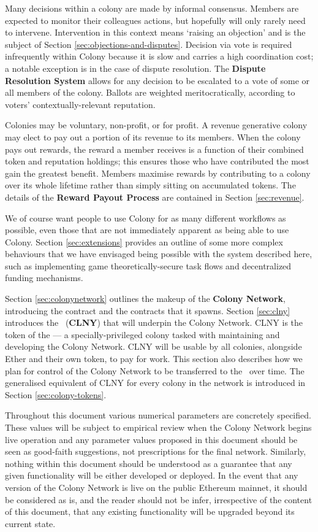 Many decisions within a colony are made by informal consensus. Members are expected to monitor their colleagues actions, but hopefully will only rarely need to intervene. Intervention in this context means `raising an objection' and is the subject of Section \ref{sec:objections-and-disputes}. Decision via vote is required infrequently within Colony because it is slow and carries a high coordination cost; a notable exception is in the case of dispute resolution. The \textbf{Dispute Resolution System} allows for any decision to be escalated to a vote of some or all members of the colony. Ballots are weighted meritocratically, according to voters' contextually-relevant reputation.

Colonies may be voluntary, non-profit, or for profit. A revenue generative colony may elect to pay out a portion of its revenue to its members. When the colony pays out rewards, the reward a member receives is a function of their combined token and reputation holdings; this ensures those who have contributed the most gain the greatest benefit. Members maximise rewards by contributing to a colony over its whole lifetime rather than simply sitting on accumulated tokens. The details of the \textbf{Reward Payout Process} are contained in Section \ref{sec:revenue}.

We of course want people to use Colony for as many different workflows as possible, even those that are not immediately apparent as being able to use Colony. Section \ref{sec:extensions} provides an outline of some more complex behaviours that we have envisaged being possible with the system described here, such as implementing game theoretically-secure task flows and decentralized funding mechanisms.

Section \ref{sec:colonynetwork} outlines the makeup of the \textbf{Colony Network}, introducing the  contract and the  contracts that it spawns. Section \ref{sec:clny} introduces the \rcts\ (\textbf{CLNY}) that will underpin the Colony Network. CLNY is the token of the \textbf{\rc} --- a specially-privileged colony tasked with maintaining and developing the Colony Network. CLNY will be usable by all colonies, alongside Ether and their own token, to pay for work. This section also describes how we plan for control of the Colony Network to be transferred to the \rc\ over time. The generalised equivalent of CLNY for every colony in the network is introduced in Section \ref{sec:colony-tokens}.

Throughout this document various numerical parameters are concretely specified. These values will be subject to empirical review when the Colony Network begins live operation and any parameter values proposed in this document should be seen as good-faith suggestions, not prescriptions for the final network. Similarly, nothing within this document should be understood as a guarantee that any given functionality will be either developed or deployed. In the event that any version of the Colony Network is live on the public Ethereum mainnet, it should be considered as is, and the reader should not be infer, irrespective of the content of this document, that any existing functionality will be upgraded beyond its current state.
